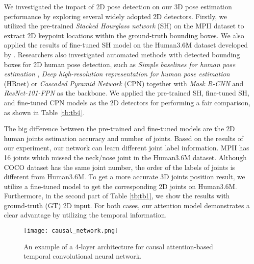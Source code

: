 \documentclass[twocolumn]{svjour3}          \smartqed  \usepackage{graphicx}
\begin{document}
We investigated the impact of 2D pose detection on our 3D pose estimation performance by exploring several widely adopted 2D detectors. Firstly, we utilized the pre-trained \emph{Stacked Hourglass network} (SH) \citep{Newell2016} on the MPII dataset to extract 2D keypoint locations within the ground-truth bounding boxes. We also applied the results of fine-tuned SH model on the Human3.6M dataset developed by \citep{Martinez2017}. Researchers also investigated automated methods with detected bounding boxes for 2D human pose detection, such as \emph{Simple baselines for human pose estimation} \citep{xiao2018}, \emph{Deep high-resolution representation for human pose estimation} (HRnet) \citep{sun2019} or \emph{Cascaded Pyramid Network} (CPN) \citep{Chen2017} together with \emph{Mask R-CNN} \citep{He2017} and \emph{ResNet-101-FPN} \citep{Lin2017} as the backbone. We applied the pre-trained SH, fine-tuned SH, and fine-tuned CPN models \citep{Pavllo2019}  as the 2D detectors for performing a fair comparison, as shown in Table \ref{tb:tb4}.

The big difference between the pre-trained and fine-tuned models are the 2D human joints estimation accuracy and number of joints. Based on the results of our experiment, our network can learn different joint label information. MPII has 16 joints which missed the neck/nose joint in the Human3.6M dataset. Although COCO dataset has the same joint number, the order of the labels of joints is different from Human3.6M. To get a more accurate 3D joints position result, we utilize a fine-tuned model to get the corresponding 2D joints on Human3.6M. Furthermore, in the second part of Table \ref{tb:tb1}, we show the results with ground-truth (GT) 2D input. For both cases, our attention model demonstrates a clear advantage by utilizing the temporal information. 

\begin{figure}
  \texttt{[image: causal\_network.png]}
  \caption{An example of a 4-layer architecture for causal attention-based temporal convolutional neural network.}\label{fig:causal}
\end{figure}
\end{document}
